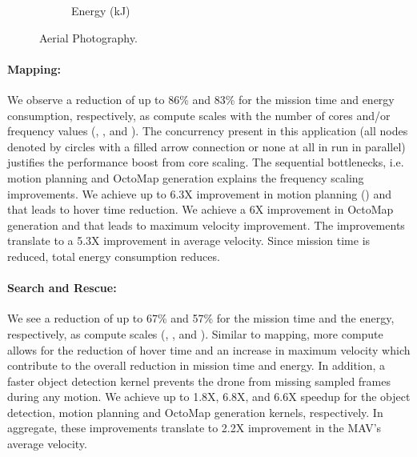 {\begin{figure}[t!]
\begin{subfigure}[t!]{.3\columnwidth}
    \caption{Energy (kJ)}
     \label{fig:benchmarks:OPA:ap:energy}
    \end{subfigure}
    \caption{Aerial Photography.}
    \label{fig:benchmarks:OPA:ap}
\end{figure}
}


\paragraph{Mapping:} We observe a reduction of up to 86\% and 83\% for the mission time and energy consumption, respectively, as compute scales with the number of cores and/or frequency values (, , and ). The concurrency present in this application (all nodes denoted by circles with a filled arrow connection or none at all in  run in parallel) justifies the performance boost from core scaling. The sequential bottlenecks, i.e. motion planning and OctoMap generation explains the frequency scaling improvements. We achieve up to 6.3X improvement in motion planning () and that leads to hover time reduction. We achieve a 6X improvement in OctoMap generation and that leads to maximum velocity improvement. The improvements translate to a 5.3X improvement in average velocity. Since mission time is reduced, total energy consumption reduces.


\paragraph{Search and Rescue:} We see a reduction of up to 67\% and 57\% for the mission time and the energy, respectively, as compute scales (, , and ). Similar to mapping, more compute allows for the reduction of hover time and an increase in maximum velocity which contribute to the overall reduction in mission time and energy. In addition, a faster object detection kernel prevents the drone from missing sampled frames during any motion. We achieve up to 1.8X, 6.8X, and 6.6X speedup for the object detection, motion planning and OctoMap generation kernels, respectively. In aggregate, these improvements translate to 2.2X improvement in the MAV's average velocity.

